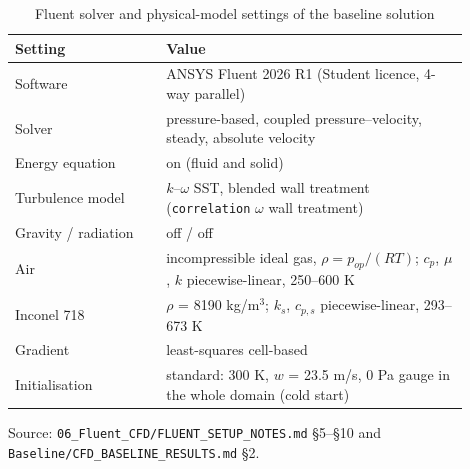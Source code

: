 \begin{table}[htbp]
\centering
\small
\caption{Fluent solver and physical-model settings of the baseline solution}
\label{tab:solver}
\begin{tabular}{>{\raggedright\arraybackslash}p{0.30\linewidth}>{\raggedright\arraybackslash}p{0.60\linewidth}}
\toprule
Setting & Value \\
\midrule
Software & ANSYS Fluent 2026 R1 (Student licence, 4-way parallel) \\
Solver & pressure-based, coupled pressure--velocity, steady, absolute velocity \\
Energy equation & on (fluid and solid) \\
Turbulence model & $k$--$\omega$ SST, blended wall treatment (\texttt{correlation} $\omega$ wall treatment) \\
Gravity / radiation & off / off \\
Air & incompressible ideal gas, $\rho = p_{op}/(RT)$; $c_p$, $\mu$, $k$ piecewise-linear, 250--600 K \\
Inconel 718 & $\rho$ = 8190 kg/m$^3$; $k_s$, $c_{p,s}$ piecewise-linear, 293--673 K \\
Gradient & least-squares cell-based \\
Initialisation & standard: 300 K, $w$ = 23.5 m/s, 0 Pa gauge in the whole domain (cold start) \\
\bottomrule
\end{tabular}
\par\smallskip\parbox{\linewidth}{\footnotesize\raggedright Source: \texttt{06\_Fluent\_CFD/FLUENT\_SETUP\_NOTES.md} \S5--\S10 and \texttt{Baseline/CFD\_BASELINE\_RESULTS.md} \S2.}
\end{table}
